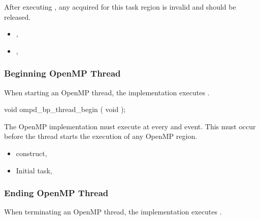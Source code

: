 After 
executing , any  acquired for this
task region is invalid and should be released.


\crossreferences
\begin{itemize}
\item
  , 
\item
  , 
\end{itemize}



\subsubsection{Beginning OpenMP Thread}
\label{subsubsec:ompd_bp_thread_begin}

\summary

When starting an OpenMP thread, the implementation executes
.

\format
\begin{cspecific}
\begin{ompSyntax}
void ompd_bp_thread_begin ( void );
\end{ompSyntax}
\end{cspecific}


\descr

The OpenMP implementation must execute 
 at every  and  event.
This must occur before the thread starts the execution of any
OpenMP region.

\crossreferences
\begin{itemize}
\item
   construct, 
\item
  Initial task, 
\end{itemize}



\subsubsection{Ending OpenMP Thread}
\label{subsubsec:ompd_bp_thread_end}

\summary

When terminating an OpenMP thread, the implementation 
executes .

